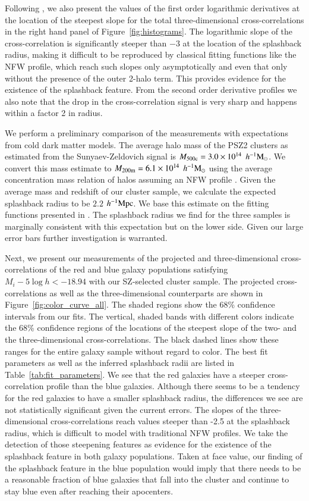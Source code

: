 \documentclass[iop, apjl, twocolappendix, numberedappendix]{emulateapj}
\def\mpch{h^{-1}{\rm Mpc}}
\def\msunh{h^{-1}{\rm M_{\odot}}}
\begin{document}
Following \citet{baxter2017halo}, we also present the values of the
first order logarithmic derivatives at the location of the steepest slope for
the total three-dimensional cross-correlations in the right hand panel of
Figure~\ref{fig:histograms}. The logarithmic slope of the
cross-correlation is significantly steeper than $-3$ at the location
of the splashback radius, making it difficult to
be reproduced by classical fitting functions like the NFW profile,
which reach such slopes only asymptotically and even that only
without the presence of the outer 2-halo term. This provides
evidence for the existence of the splashback feature. From the second
order derivative profiles we also note that the drop in the cross-correlation
signal is very sharp and happens within a factor 2 in radius.

We perform a preliminary comparison of the measurements with
expectations from cold dark matter models. The average halo mass of
the PSZ2 clusters as estimated from the Sunyaev-Zeldovich signal
is $M_{\rm 500c}=3.0\times10^{14}$ $\msunh$. We convert this mass
estimate to $M_{\rm 200m}=6.1\times10^{14}$ $\msunh$ using the average
concentration mass relation of halos \citep{Diemer2015} assuming an NFW profile
\citep{HuKravtsov:2003}. Given the average mass and redshift of our
cluster sample, we calculate the expected splashback radius to be
$2.2$ $\mpch$. We base this estimate on the fitting functions
presented in \citet{more2015splashback}. The splashback radius we
find for the three samples is marginally consistent with this expectation
but on the lower side. Given our large error bars further investigation is
warranted.

Next, we present our measurements of the projected and
three-dimensional cross-correlations of the red and blue galaxy populations
satisfying $M_{i}-5\log h<-18.94$ with our SZ-selected cluster
sample. The projected cross-correlations as well as the three-dimensional
counterparts are shown in Figure~\ref{fig:color_curve_all}. The shaded regions show
the 68\% confidence intervals from our fits. The vertical, shaded
bands with different colors indicate the 68\% confidence regions of
the locations of the steepest slope of the two- and the
three-dimensional cross-correlations. The black dashed lines show
these ranges for the entire galaxy sample without regard to color.
The best fit parameters as well as the inferred splashback radii are
listed in Table~\ref{tab:fit_parameters}. We
see that the red galaxies have a steeper cross-correlation profile
than the blue galaxies. Although there seems to be  a tendency for the red
galaxies to have a smaller splashback radius, the differences we see
are not statistically significant given the current errors. The
slopes of the three-dimensional cross-correlations reach values
steeper than -2.5 at the splashback radius, which is difficult to model with
traditional NFW profiles. We take the detection of those steepening features
as evidence for the existence of the splashback feature in both galaxy populations.
Taken at face value, our finding of the splashback feature in the blue
population would imply that there needs to be a reasonable fraction of
blue galaxies that fall into the cluster and continue to stay blue
even after reaching their apocenters.
\end{document}

